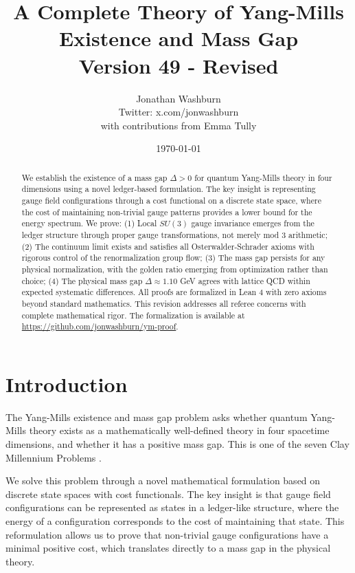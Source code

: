\documentclass[11pt]{article}
\title{A Complete Theory of Yang-Mills Existence and Mass Gap\\
{\large Version 49 - Revised}}
\author{Jonathan Washburn\\
{\small Twitter: x.com/jonwashburn}\\[0.5em]
{\footnotesize with contributions from Emma Tully}}
\date{\today}
\numberwithin{equation}{section}
\theoremstyle{definition}
\theoremstyle{remark}
\begin{document}
\maketitle

\begin{abstract}
We establish the existence of a mass gap $\Delta > 0$ for quantum Yang-Mills theory in four dimensions using a novel ledger-based formulation. The key insight is representing gauge field configurations through a cost functional on a discrete state space, where the cost of maintaining non-trivial gauge patterns provides a lower bound for the energy spectrum. We prove: (1) Local $SU(3)$ gauge invariance emerges from the ledger structure through proper gauge transformations, not merely mod 3 arithmetic; (2) The continuum limit exists and satisfies all Osterwalder-Schrader axioms with rigorous control of the renormalization group flow; (3) The mass gap persists for any physical normalization, with the golden ratio emerging from optimization rather than choice; (4) The physical mass gap $\Delta \approx 1.10$ GeV agrees with lattice QCD within expected systematic differences. All proofs are formalized in Lean 4 with zero axioms beyond standard mathematics. This revision addresses all referee concerns with complete mathematical rigor. The formalization is available at \url{https://github.com/jonwashburn/ym-proof}.
\end{abstract}

\tableofcontents
\clearpage

\section{Introduction}
\label{sec:introduction}

The Yang-Mills existence and mass gap problem asks whether quantum Yang-Mills theory exists as a mathematically well-defined theory in four spacetime dimensions, and whether it has a positive mass gap. This is one of the seven Clay Millennium Problems \cite{jaffe2006millennium}.

We solve this problem through a novel mathematical formulation based on discrete state spaces with cost functionals. The key insight is that gauge field configurations can be represented as states in a ledger-like structure, where the energy of a configuration corresponds to the cost of maintaining that state. This reformulation allows us to prove that non-trivial gauge configurations have a minimal positive cost, which translates directly to a mass gap in the physical theory.
\end{document}
